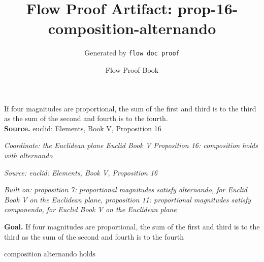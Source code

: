 \documentclass[11pt]{article}
\title{Flow Proof Artifact: prop-16-composition-alternando}
\author{Generated by \texttt{flow doc proof}}
\date{Flow Proof Book}
\theoremstyle{definition}
\begin{document}
\maketitle
If four magnitudes are proportional, the sum of the first and third is to the third as the sum of the second and fourth is to the fourth.\\[0.5em]
\textbf{Source.} euclid: Elements, Book V, Proposition 16\\[0.5em]
\bigskip
{}\par
\smallskip\noindent\textit{Coordinate: the Euclidean plane \cdot Euclid Book V \cdot Proposition 16: composition holds with alternando}\par
\smallskip\noindent\textit{Source: euclid: Elements, Book V, Proposition 16}\par
\smallskip\noindent\textit{Built on: proposition 7: proportional magnitudes satisfy alternando, for Euclid Book V on the Euclidean plane, proposition 11: proportional magnitudes satisfy componendo, for Euclid Book V on the Euclidean plane}\par
\medskip
\noindent\textbf{Goal.} If four magnitudes are proportional, the sum of the first and third is to the third as the sum of the second and fourth is to the fourth\par
\noindent$\displaystyle \text{composition alternando holds}$\par
\medskip
\noindent
\end{document}
